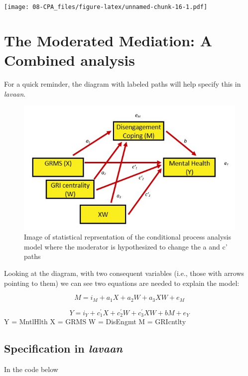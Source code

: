 \documentclass[
  11pt,
]{book}
\begin{document}
\texttt{[image: 08-CPA\_files/figure-latex/unnamed-chunk-16-1.pdf]}

\hypertarget{the-moderated-mediation-a-combined-analysis}{%
\section{The Moderated Mediation: A Combined analysis}\label{the-moderated-mediation-a-combined-analysis}}

For a quick reminder, the diagram with labeled paths will help specify this in \emph{lavaan}.

\begin{figure}
\centering
\includegraphics{images/ModMed/LewisStatistical.jpg}
\caption{Image of statistical reprsentation of the conditional process analysis model where the moderator is hypothesized to change the a and c' paths}
\end{figure}

Looking at the diagram, with two consequent variables (i.e., those with arrows pointing to them) we can see two equations are needed to explain the model:

\[M = i_{M}+a_{1}X + a_{2}W + a_{3}XW + e_{M}\]

\[Y = i_{Y}+c_{1}^{'}X+ c_{2}^{'}W+c_{3}^{'}XW+ bM+e_{Y}\] Y = MntlHlth X = GRMS W = DisEngmt M = GRIcntlty

\hypertarget{specification-in-lavaan}{%
\subsection{\texorpdfstring{Specification in \emph{lavaan}}{Specification in lavaan}}\label{specification-in-lavaan}}

In the code below
\end{document}
